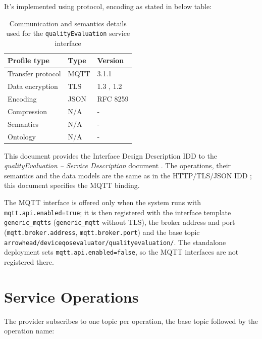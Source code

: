\documentclass[a4paper]{arrowhead}
\begin{document}
It's implemented using protocol, encoding as stated in below table:
\begin{table}[ht!]
  \centering
  \begin{tabular}{|l|l|l|}
    \hline
    \rowcolor{gray!33} Profile type & Type & Version \\ \hline
    Transfer protocol & MQTT & 3.1.1 \cite{mqtt311} \\ \hline
    Data encryption & TLS & 1.3 \cite{rfc8446}, 1.2 \cite{rfc5246} \\ \hline
    Encoding & JSON & RFC 8259 \cite{rfc8259} \\ \hline
    Compression & N/A & - \\ \hline
    Semantics & N/A & - \\ \hline
    Ontology & N/A & - \\ \hline
  \end{tabular}
  \caption{Communication and semantics details used for the \texttt{qualityEvaluation} service interface}
  \label{tab:comunication_semantics_profile}
\end{table}

This document provides the Interface Design Description IDD to the \textit{qualityEvaluation -- Service Description} document \cite{dqe-qualityEvaluation-sd}.
The operations, their semantics and the data models are the same as in the HTTP/TLS/JSON IDD \cite{dqe-qualityEvaluation-http-idd}; this document specifies the MQTT binding.

The MQTT interface is offered only when the system runs with \texttt{mqtt.api.enabled=true}; it is then registered with the interface template \texttt{generic\_\allowbreak{}mqtts} (\texttt{generic\_\allowbreak{}mqtt} without TLS), the broker address and port (\texttt{mqtt.\allowbreak{}broker.\allowbreak{}address}, \texttt{mqtt.\allowbreak{}broker.\allowbreak{}port}) and the base topic \texttt{arrowhead/\allowbreak{}deviceqosevaluator/\allowbreak{}qualityevaluation/\allowbreak{}}. The standalone deployment sets \texttt{mqtt.\allowbreak{}api.\allowbreak{}enabled=\allowbreak{}false}, so the MQTT interfaces are not registered there.

\newpage

\section{Service Operations}
\label{sec:operations}

The provider subscribes to one topic per operation, the base topic followed by the operation name:
\end{document}
